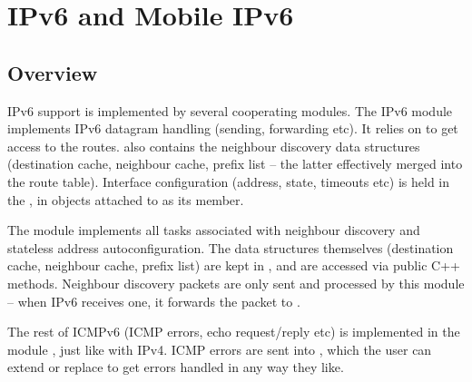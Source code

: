 \chapter{IPv6 and Mobile IPv6}
\label{cha:ipv6}


\section{Overview}

IPv6 support is implemented by several cooperating modules. The IPv6 module
implements IPv6 datagram handling (sending, forwarding etc). It relies on
 to get access to the routes.  also contains the
neighbour discovery data structures (destination cache, neighbour cache,
prefix list -- the latter effectively merged into the route table). Interface
configuration (address, state, timeouts etc) is held in the ,
in  objects attached to 
as its  member.

The module  implements all tasks associated with
neighbour discovery and stateless address autoconfiguration. The data
structures themselves (destination cache, neighbour cache, prefix list)
are kept in , and are accessed via public C++ methods.
Neighbour discovery packets are only sent and processed by this module --
when IPv6 receives one, it forwards the packet to .

The rest of ICMPv6 (ICMP errors, echo request/reply etc) is implemented in
the module , just like with IPv4. ICMP errors are sent into
, which the user can extend or replace to get errors
handled in any way they like.



